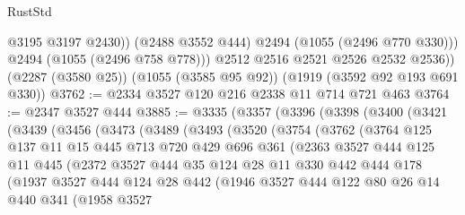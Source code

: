 \begin{lexlean}{RustStd}
\begin{coremodule}
                @3195
                @3197
                @2430))
            (@2488 @3552 @444)
            @2494
            (@1055 (@2496 @770 @330)))
          @2494
          (@1055 (@2496 @758 @778)))
        @2512
        @2516
        @2521
        @2526
        @2532
        @2536))
    (@2287 (@3580 @25))
    (@1055 (@3585 @95 @92))
    (@1919 (@3592 @92 @193 @691 @330))
@3762 := @2334 @3527 @120 @216 @2338 @11 @714 @721 @463
@3764 := @2347 @3527 @444
@3885 := @3335
    (@3357
      (@3396
        (@3398
          (@3400
            (@3421
              (@3439
                (@3456
                  (@3473
                    (@3489
                      (@3493
                        (@3520
                          (@3754
                            (@3762
                              (@3764
                                @125
                                @137
                                @11
                                @15
                                @445
                                @713
                                @720
                                @429
                                @696
                                @361
                                (@2363
                                  @3527
                                  @444
                                  @125
                                  @11
                                  @445
                                  (@2372
                                    @3527
                                    @444
                                    @35
                                    @124
                                    @28
                                    @11
                                    @330
                                    @442
                                    @444
                                    @178
                                    (@1937
                                      @3527
                                      @444
                                      @124
                                      @28
                                      @442
                                      (@1946
                                        @3527
                                        @444
                                        @122
                                        @80
                                        @26
                                        @14
                                        @440
                                        @341
                                        (@1958
                                          @3527

\end{coremodule}
\end{lexlean}
